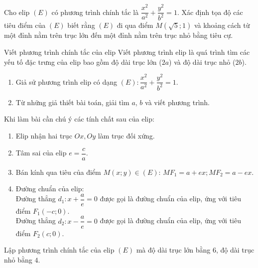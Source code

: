 \begin{bt}%
	Cho elip $(E)$ có phương trình chính tắc là $\dfrac{x^2}{a^2} + \dfrac{y^2}{b^2} = 1$. Xác định tọa độ các tiêu điểm của $(E)$ biết rằng $(E)$ đi qua điểm $M(\sqrt{5};1)$ và khoảng cách từ một đỉnh nằm trên trục lớn đến một đỉnh nằm trên trục nhỏ bằng tiêu cự.
\end{bt}

\begin{dang}{Viết phương trình chính tắc của elip}
Viết phương trình elip là quá trình tìm các yếu tố đặc trưng của elip bao gồm độ dài trục lớn ($2a$) và độ dài trục nhỏ ($2b$).
\begin{enumerate}[Bước 1.]
	\item Giả sử phương trình elip có dạng $(E)\colon\dfrac{x^{2}}{a^{2}}+\dfrac{y^{2}}{b^{2}}=1$.
	\item Từ những giả thiết bài toán, giải tìm $a$, $b$ và viết phương trình. 
\end{enumerate}
\begin{note}
	Khi làm bài cần chú ý các tính chất sau của elip:
	\begin{enumerate}
		\item Elip nhận hai trục $Ox,Oy$ làm trục đối xứng. 
		\item Tâm sai của elip $e=\dfrac{c}{a}$.
		\item Bán kính qua tiêu của điểm $M(x;y)\in (E)$: $MF_1=a+ex; MF_2=a-ex$.
		\item Đường chuẩn của elip:\\Đường thẳng $d_1: x+\dfrac{a}{e}=0$ được gọi là đường chuẩn của elip, ứng với tiêu điểm $F_1(-c;0)$.\\Đường thẳng $d_2: x-\dfrac{a}{e}=0$ được gọi là đường chuẩn của elip, ứng với tiêu điểm $F_2(c;0).$      
	\end{enumerate}
\end{note}
\end{dang}
\begin{vd}%
	Lập phương trình chính tắc của elip $(E)$ mà độ dài trục lớn bằng  $6$, độ dài trục nhỏ bằng $4$.
\end{vd}
